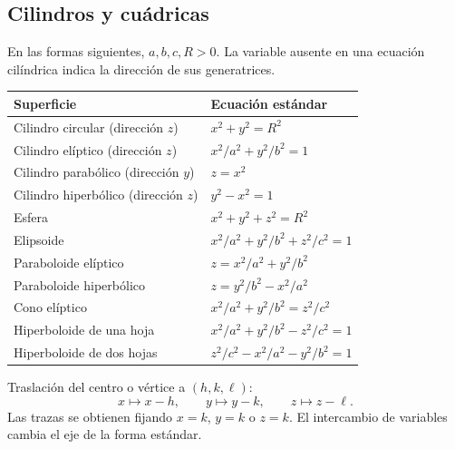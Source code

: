 \subsection*{Cilindros y cuádricas}
En las formas siguientes, $a,b,c,R>0$. La variable ausente en una ecuación
cilíndrica indica la dirección de sus generatrices.
\begin{center}
\renewcommand{\arraystretch}{1.9}
\begin{tabular}{@{}p{6cm}p{\dimexpr\textwidth-6cm-2\tabcolsep\relax}@{}}
\hline
Superficie & Ecuación estándar\\\hline
Cilindro circular (dirección $z$) & $x^2+y^2=R^2$\\
Cilindro elíptico (dirección $z$) & $\displaystyle x^2/a^2+y^2/b^2=1$\\
Cilindro parabólico (dirección $y$) & $z=x^2$\\
Cilindro hiperbólico (dirección $z$) & $y^2-x^2=1$\\\hline
Esfera & $x^2+y^2+z^2=R^2$\\
Elipsoide & $\displaystyle x^2/a^2+y^2/b^2+z^2/c^2=1$\\
Paraboloide elíptico & $\displaystyle z=x^2/a^2+y^2/b^2$\\
Paraboloide hiperbólico & $\displaystyle z=y^2/b^2-x^2/a^2$\\
Cono elíptico & $\displaystyle x^2/a^2+y^2/b^2=z^2/c^2$\\
Hiperboloide de una hoja & $\displaystyle x^2/a^2+y^2/b^2-z^2/c^2=1$\\
Hiperboloide de dos hojas & $\displaystyle z^2/c^2-x^2/a^2-y^2/b^2=1$\\\hline
\end{tabular}
\end{center}
Traslación del centro o vértice a $(h,k,\ell)$:
\[
x\mapsto x-h,\qquad y\mapsto y-k,\qquad z\mapsto z-\ell.
\]
Las trazas se obtienen fijando $x=k$, $y=k$ o $z=k$.
El intercambio de variables cambia el eje de la forma estándar.
\endgroup
